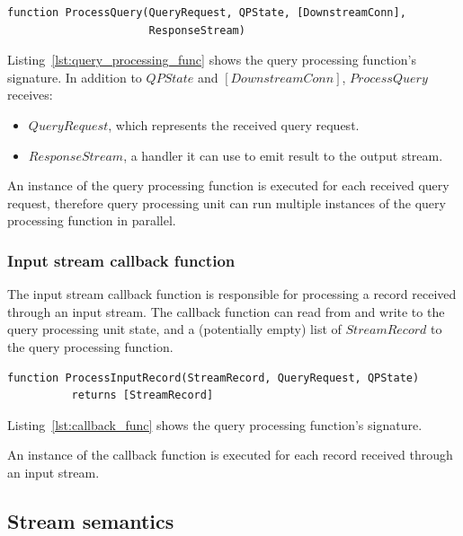 \begin{lstlisting}[caption={Query processing function signature},captionpos=b,label={lst:query_processing_func}]
function ProcessQuery(QueryRequest, QPState, [DownstreamConn],
                      ResponseStream)
\end{lstlisting}

\noindent
\begin{sloppypar}
Listing~\ref{lst:query_processing_func} shows the query processing function's signature.
In addition to $QPState$ and $[DownstreamConn]$, $ProcessQuery$ receives:
\end{sloppypar}
\begin{itemize}
  \item $QueryRequest$, which represents the received query request.

  \item $ResponseStream$, a handler it can use to emit result to the output stream.

\end{itemize}

An instance of the query processing function is executed for each received query request,
therefore query processing unit can run multiple instances of the query processing function in parallel.

\subsubsection{Input stream callback function}
\label{sec:callback_func}

The input stream callback function is responsible for processing a record received through an input stream.
The callback function can read from and write to the query processing unit state,
and a (potentially empty) list of $StreamRecord$ to the query processing function.

\begin{lstlisting}[caption={Input stream callback function signature},captionpos=b,label={lst:callback_func}]
function ProcessInputRecord(StreamRecord, QueryRequest, QPState)
          returns [StreamRecord]
\end{lstlisting}

\noindent
Listing~\ref{lst:callback_func} shows the query processing function's signature.

An instance of the callback function is executed for each record received through an input stream.

\subsection{Stream semantics}

